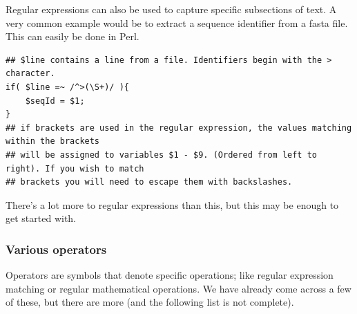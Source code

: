 \documentclass[11pt]{article}
\begin{document}
Regular expressions can also be used to capture specific subsections of
text. A very common example would be to extract a sequence identifier
from a fasta file. This can easily be done in Perl.

\begin{verbatim}
## $line contains a line from a file. Identifiers begin with the > character.
if( $line =~ /^>(\S+)/ ){
    $seqId = $1;
}
## if brackets are used in the regular expression, the values matching within the brackets
## will be assigned to variables $1 - $9. (Ordered from left to right). If you wish to match
## brackets you will need to escape them with backslashes.
\end{verbatim}

There's a lot more to regular expressions than this, but this may be enough to get
started with.

\subsubsection{Various operators}
\label{sec-5-0-7}

Operators are symbols that denote specific operations; like regular
expression matching or regular mathematical operations. We have already
come across a few of these, but there are more (and the following list
is not complete).
\end{document}
